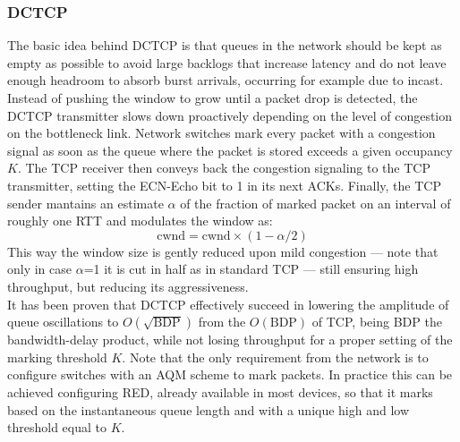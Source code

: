 \subsubsection{DCTCP}
\label{sec:dctcp}
The basic idea behind DCTCP is that queues in the network should be kept as empty as possible to avoid large backlogs that increase latency and do not leave enough headroom to absorb burst arrivals, occurring for example due to incast. Instead of pushing the window to grow until a packet drop is detected, the DCTCP transmitter slows down proactively depending on the level of congestion on the bottleneck link. Network switches mark every packet with a congestion signal as soon as the queue where the packet is stored exceeds a given occupancy $K$. The TCP receiver then conveys back the congestion signaling to the TCP transmitter, setting the ECN-Echo bit to 1 in its next ACKs. Finally, the TCP sender mantains an estimate $\alpha$ of the fraction of marked packet on an interval of roughly one RTT and modulates the window as:
\[ \text{cwnd} = \text{cwnd} \times (1-\alpha/2)\]
This way the window size is gently reduced upon mild congestion --- note that only in case $\alpha$=1 it is cut in half as in standard TCP --- still ensuring high throughput, but reducing its aggressiveness.\\It has been proven that DCTCP effectively succeed in lowering the amplitude of queue oscillations to $O(\sqrt{\text{BDP}})$ from the  $O(\text{BDP})$ of TCP, being BDP the bandwidth-delay product, while not losing throughput for a proper setting of the marking threshold $K$. Note that the only requirement from the network is to configure switches with an AQM scheme to mark packets. In practice this can be achieved configuring RED, already available in most devices, so that it marks based on the instantaneous queue length and with a unique high and low threshold equal to $K$.